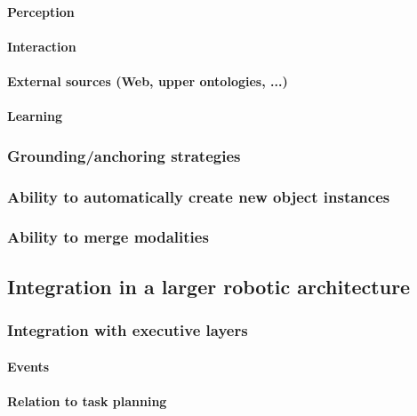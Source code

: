 \documentclass[a4paper, twocolumn]{article}
\begin{document}
\paragraph{Perception}
\paragraph{Interaction}
\paragraph{External sources (Web, upper ontologies, ...)}
\paragraph{Learning}

\subsubsection{Grounding/anchoring strategies}
\label{sect|grounding}

\subsubsection{Ability to automatically create new object instances}
\label{sect|new-instances}

\subsubsection{Ability to merge modalities}
\label{sect|modalities-merging}

\subsection{Integration in a larger robotic architecture}
\label{sect|integration-robot}

\subsubsection{Integration with executive layers}
\label{sect|integration-executive-layers}

\paragraph{Events}

\paragraph{Relation to task planning}
\end{document}
